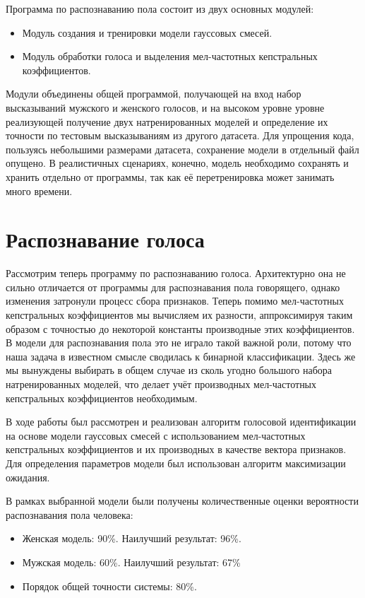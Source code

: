 \documentclass[12pt]{gost-7-32}
\begin{document}
Программа по распознаванию пола состоит из двух основных модулей:
\begin{itemize}
    \item Модуль создания и тренировки модели гауссовых смесей.
    \item Модуль обработки голоса и выделения мел-частотных кепстральных коэффициентов.
\end{itemize}

Модули объединены общей программой, получающей на вход набор высказываний мужского и женского голосов, и на высоком уровне уровне реализующей получение двух натренированных моделей и определение их точности по тестовым высказываниям из другого датасета.
Для упрощения кода, пользуясь небольшими размерами датасета, сохранение модели в отдельный файл опущено.
В реалистичных сценариях, конечно, модель необходимо сохранять и хранить отдельно от программы, так как её перетренировка может занимать много времени.

\section{Распознавание голоса}

Рассмотрим теперь программу по распознаванию голоса.
Архитектурно она не сильно отличается от программы для распознавания пола говорящего, однако изменения затронули процесс сбора признаков.
Теперь помимо мел-частотных кепстральных коэффициентов мы вычисляем их разности, аппроксимируя таким образом с точностью до некоторой константы производные этих коэффициентов.
В модели для распознавания пола это не играло такой важной роли, потому что наша задача в известном смысле сводилась к бинарной классификации.
Здесь же мы вынуждены выбирать в общем случае из сколь угодно большого набора натренированных моделей, что делает учёт производных мел-частотных кепстральных коэффициентов необходимым.

\newpage
\conclusion

В ходе работы был рассмотрен и реализован алгоритм голосовой идентификации на основе модели гауссовых смесей с использованием мел-частотных кепстральных коэффициентов и их производных в качестве вектора признаков.
Для определения параметров модели был использован алгоритм максимизации ожидания.

В рамках выбранной модели были получены количественные оценки вероятности распознавания пола человека:
\begin{itemize}
    \item Женская модель: 90\%.
        Наилучший результат: 96\%.
    \item Мужская модель: 60\%.
        Наилучший результат: 67\%
    \item Порядок общей точности системы: 80\%.
\end{itemize}
\end{document}
